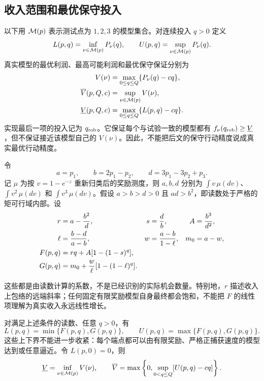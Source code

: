 \subsection{收入范围和最优保守投入}
以下用 $\mathcal M(p)$ 表示测试点为 $1,2,3$ 的模型集合。对连续投入 $q>0$ 定义
\begin{equation}\label{eq:envelopes}
 L(p,q)=\inf_{\nu\in\mathcal M(p)}P_\nu(q),\qquad
 U(p,q)=\sup_{\nu\in\mathcal M(p)}P_\nu(q).
\end{equation}
真实模型的最优利润、最高可能利润和最优保守保证分别为
\begin{align}
 V(\nu)&=\max_{0\leq q\leq Q}\{P_\nu(q)-cq\},\notag\\
 \overline V(p,Q,c)&=\sup_{\nu\in\mathcal M(p)}V(\nu),\label{eq:values}\\
 \underline V(p,Q,c)&=\max_{0\leq q\leq Q}\{L(p,q)-cq\}.\notag
\end{align}
实现最后一项的投入记为 $q_{\mathrm{rob}}$。它保证每个与试验一致的模型都有 $f_\nu(q_{\mathrm{rob}})\geq\underline V$，但不保证接近该模型自己的 $V(\nu)$。因此，不能把后文的保守行动精度说成真实最优行动精度。

令
\begin{equation}\label{eq:moments}
 a=p_1,\qquad b=2p_1-p_2,\qquad d=3p_1-3p_2+p_3.
\end{equation}
记 $\mu$ 为按 $v=1-e^{-z}$ 重新归类后的奖励测度，则 $a,b,d$ 分别为 $\int v\,\mu(dv)$、$\int v^2\,\mu(dv)$ 和 $\int v^3\,\mu(dv)$。假设 $a>b>d>0$ 且 $ad>b^2$，即读数处于严格的矩可行域内部。设
\begin{align}
 r&=a-\frac{b^2}{d},&s&=\frac db,&A&=\frac{b^3}{d^2},\notag\\
 \ell&=\frac{b-d}{a-b},&w&=\frac{a-b}{1-\ell},&m_0&=a-w,\label{eq:parameters}\\
 F(p,q)&=rq+A[1-(1-s)^q],&&\notag\\
 G(p,q)&=m_0+\frac w\ell[1-(1-\ell)^q].&&\notag
\end{align}

这些都是由读数计算的系数，不是已经识别的实际机会数量。特别地，$r$ 描述收入上包络的远端斜率；任何固定有限奖励模型自身最终都会饱和，不能把 $F$ 的线性项理解为真实收入永远线性增长。

\begin{theorem}[三个测试点确定的收入范围]\label{thm:bounds}
对满足上述条件的读数、任意 $q>0$，有
\begin{equation}\label{eq:exact}
 L(p,q)=\min\{F(p,q),G(p,q)\},\qquad
 U(p,q)=\max\{F(p,q),G(p,q)\}.
\end{equation}
这些上下界不能进一步收紧：每个端点都可以由有限奖励、严格正捕获速度的模型达到或任意逼近。令 $L(p,0)=0$，则
\begin{equation}\label{eq:profitbounds}
 \underline V=\inf_{\nu\in\mathcal M(p)}V(\nu),\qquad
 \overline V=\max\left\{0,\sup_{0<q\leq Q}[U(p,q)-cq]\right\}.
\end{equation}
\end{theorem}

